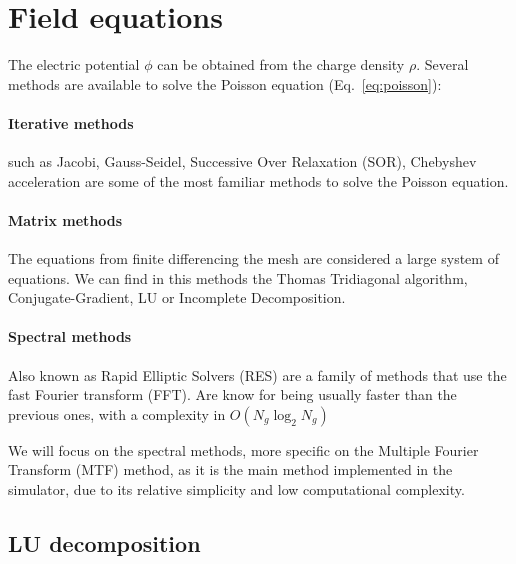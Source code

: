 \section{Field equations}

The electric potential $\phi$ can be obtained from the charge density $\rho$.  
Several methods are available to solve the Poisson equation 
(Eq.~\ref{eq:poisson}):

\paragraph{Iterative  methods} such as Jacobi, Gauss-Seidel, Successive Over 
Relaxation (SOR), Chebyshev acceleration are some of the most familiar methods 
to solve the Poisson equation.

\paragraph{Matrix methods} The equations from finite differencing the mesh are 
considered a large system of equations. We can find in this methods the Thomas 
Tridiagonal algorithm, Conjugate-Gradient, LU or Incomplete Decomposition.

\paragraph{Spectral methods} Also known as Rapid Elliptic Solvers (RES) are a 
family of methods that use the fast Fourier transform (FFT). Are know for being 
usually faster than the previous ones, with a complexity in $O(N_g \log_2 N_g)$

\vspace{1em}
\noindent
%
We will focus on the spectral methods, more specific on the Multiple Fourier 
Transform (MTF) method, as it is the main method implemented in the simulator, 
due to its relative simplicity and low computational complexity.

\subsection{LU decomposition}

